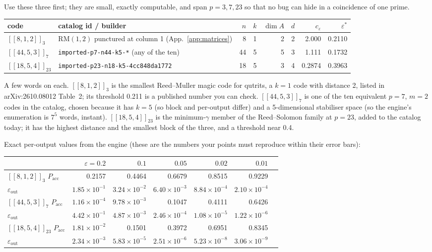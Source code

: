 \documentclass[11pt]{article}
\newcommand{\eps}{\varepsilon}
\newcommand{\code}[1]{\texttt{#1}}
\begin{document}
Use these three first; they are small, exactly computable, and span $p=3,7,23$ so
that no bug can hide in a coincidence of one prime.

\begin{center}\small
\begin{tabular}{llrrrrrr}
\toprule
code & catalog id / builder & $n$ & $k$ & $\dim A$ & $d$ & $c_\eps$ & $\eps^{*}$\\
\midrule
$[[8,1,2]]_3$ & RM$(1,2)$ punctured at column 1 (App.~\ref{app:matrices}) & 8 & 1 & 2 & 2 & 2.000 & 0.2110\\
$[[44,5,3]]_7$ & \code{imported-p7-n44-k5-*} (any of the ten) & 44 & 5 & 5 & 3 & 1.111 & 0.1732\\
$[[18,5,4]]_{23}$ & \code{imported-p23-n18-k5-4cc848da1772} & 18 & 5 & 3 & 4 & 0.2874 & 0.3963\\
\bottomrule
\end{tabular}
\end{center}

A few words on each. $[[8,1,2]]_3$ is the smallest Reed--Muller magic code for
qutrits, a $k=1$ code with distance 2, listed in arXiv:2610.08012 Table~2; its
threshold 0.211 is a published number you can check. $[[44,5,3]]_7$ is one of the
ten equivalent $p=7$, $m=2$ codes in the catalog, chosen because it has $k=5$ (so
block and per-output differ) and a 5-dimensional stabiliser space (so the engine's
enumeration is $7^{5}$ words, instant). $[[18,5,4]]_{23}$ is the minimum-$\gamma$
member of the Reed--Solomon family at $p=23$, added to the catalog today; it has the
highest distance and the smallest block of the three, and a threshold near 0.4.

Exact per-output values from the engine (these are the numbers your points must
reproduce within their error bars):

\begin{center}\small
\begin{tabular}{lrrrrrr}
\toprule
 & $\eps=0.2$ & $0.1$ & $0.05$ & $0.02$ & $0.01$\\
\midrule
$[[8,1,2]]_3$ \; $P_{\mathrm{acc}}$ & 0.2157 & 0.4464 & 0.6679 & 0.8515 & 0.9229\\
\phantom{$[[8,1,2]]_3$} \; $\eps_{\mathrm{out}}$ & $1.85\times10^{-1}$ & $3.24\times10^{-2}$ & $6.40\times10^{-3}$ & $8.84\times10^{-4}$ & $2.10\times10^{-4}$\\
$[[44,5,3]]_7$ \; $P_{\mathrm{acc}}$ & $1.16\times10^{-4}$ & $9.78\times10^{-3}$ & 0.1047 & 0.4111 & 0.6426\\
\phantom{$[[44,5,3]]_7$} \; $\eps_{\mathrm{out}}$ & $4.42\times10^{-1}$ & $4.87\times10^{-3}$ & $2.46\times10^{-4}$ & $1.08\times10^{-5}$ & $1.22\times10^{-6}$\\
$[[18,5,4]]_{23}$ \; $P_{\mathrm{acc}}$ & $1.81\times10^{-2}$ & 0.1501 & 0.3972 & 0.6951 & 0.8345\\
\phantom{$[[18,5,4]]_{23}$} \; $\eps_{\mathrm{out}}$ & $2.34\times10^{-3}$ & $5.83\times10^{-5}$ & $2.51\times10^{-6}$ & $5.23\times10^{-8}$ & $3.06\times10^{-9}$\\
\bottomrule
\end{tabular}
\end{center}
\end{document}
